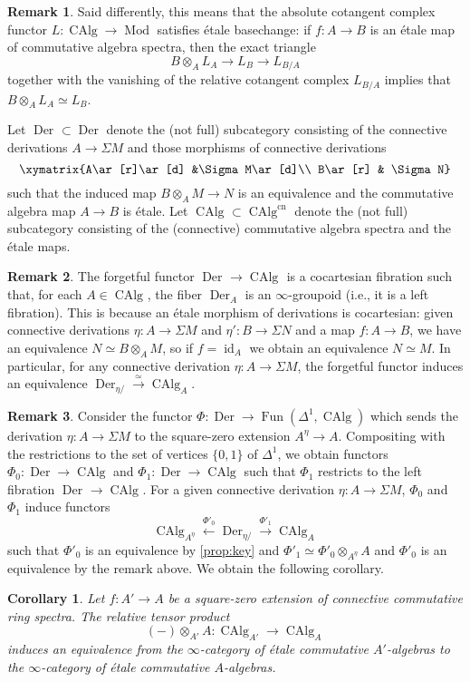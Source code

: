\documentclass[12pt]{article}
\newtheorem{corollary}{Corollary}[subsection]
\theoremstyle{definition}
\newtheorem{remark}{Remark}[subsection]
\renewcommand{\i}{\infty}
\newcommand{\too}{\longrightarrow}
\newcommand{\from}{\longleftarrow}
\DeclareMathOperator{\et}{\acute{e}t}
\DeclareMathOperator{\Mod}{Mod}
\DeclareMathOperator{\CAlg}{CAlg}
\DeclareMathOperator{\Der}{Der}
\DeclareMathOperator{\Fun}{Fun}
\DeclareMathOperator{\id}{id}
\newcommand{\cn}{\mathrm{cn}}
\begin{document}
\begin{remark}
Said differently, this means that the absolute cotangent complex functor $L:\CAlg\to\Mod$ satisfies \'etale basechange:
if $f:A\to B$ is an \'etale map of commutative algebra spectra, then the exact triangle
\[
B\otimes_A L_A\too L_B\too L_{B/A}
\]
together with the vanishing of the relative cotangent complex $L_{B/A}$ implies that $B\otimes_A L_A\simeq L_B$.
\end{remark}


Let $\Der^{\et}\subset\Der$ denote the (not full) subcategory consisting of the connective derivations $A\to\Sigma M$ and those morphisms of connective derivations
\[
\xymatrix{A\ar[r]\ar[d] &\Sigma M\ar[d]\\
B\ar[r] & \Sigma N}
\]
such that the induced map $B\otimes_A M\to N$ is an equivalence and the commutative algebra map $A\to B$ is \'etale.
Let $\CAlg^{\et}\subset\CAlg^{\cn}$ denote the (not full) subcategory consisting of the (connective) commutative algebra spectra and the \'etale maps.
\begin{remark}
The forgetful functor $\Der^{\et}\to\CAlg^{\et}$ is a cocartesian fibration such that, for each $A\in\CAlg^{\et}$, the fiber $\Der^{\et}_A$ is an $\i$-groupoid (i.e., it is a left fibration).
This is because an \'etale morphism of derivations is cocartesian: given connective derivations $\eta:A\to\Sigma M$ and $\eta':B\to\Sigma N$ and a map $f:A\to B$, we have an equivalence $N\simeq B\otimes_A M$, so if $f=\id_A$ we obtain an equivalence $N\simeq M$.
In particular, for any connective derivation $\eta:A\to\Sigma M$, the forgetful functor induces an equivalence
$
\Der^{\et}_{\eta/}\overset{\simeq}{\too}\CAlg_{A}^{\et}.
$
\end{remark}

\begin{remark}
Consider the functor $\Phi:\Der\to\Fun(\Delta^1,\CAlg)$ which sends the derivation $\eta:A\to\Sigma M$ to the square-zero extension $A^\eta\to A$.
Compositing with the restrictions to the set of vertices $\{0,1\}$ of $\Delta^1$, we obtain functors $\Phi_0:\Der\to\CAlg$ and $\Phi_1:\Der\to\CAlg$ such that $\Phi_1$ restricts to the left fibration $\Der^{\et}\to\CAlg^{\et}$.
For a given connective derivation $\eta:A\to\Sigma M$, $\Phi_0$ and $\Phi_1$ induce functors
\[
\CAlg^{\et}_{A^\eta}\overset{\Phi'_0}{\from}\Der^{\et}_{\eta/}\overset{\Phi'_1}{\too}\CAlg^{\et}_A
\]
such that $\Phi'_0$ is an equivalence by \autoref{prop:key} and $\Phi'_1\simeq\Phi'_0\otimes_{A^\eta} A$ and $\Phi'_0$ is an equivalence by the remark above.
We obtain the following corollary.
\end{remark}
\begin{corollary} Let $f:A'\to A$ be a square-zero extension of connective commutative ring spectra. The relative
tensor product
\[
(-)\otimes_{A'} A:\CAlg_{A'}\too\CAlg_A
\]
induces an equivalence from the $\infty$-category of \'etale commutative $A'$-algebras to the $\infty$-category of \'etale commutative $A$-algebras.
\end{corollary}
\end{document}
